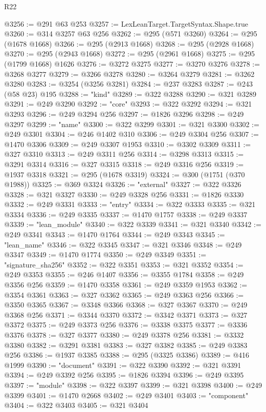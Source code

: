\begin{lexlean}{R22}
\begin{coremodule}
@3256 := @291 @63 @253
@3257 := LexLeanTarget.TargetSyntax.Shape.true
@3260 := @314 @3257 @63 @256
@3262 := @295 (@571 @3260)
@3264 := @295 (@1678 @1668)
@3266 := @295 (@2913 @1668)
@3268 := @295 (@2928 @1668)
@3270 := @295 (@2943 @1668)
@3272 := @295 (@2961 @1668)
@3275 := @295 (@1799 @1668) @1626
@3276 := @3272 @3275
@3277 := @3270 @3276
@3278 := @3268 @3277
@3279 := @3266 @3278
@3280 := @3264 @3279
@3281 := @3262 @3280
@3283 := @3254 (@3256 @3281)
@3284 := @237 @3283
@3287 := @243 (@58 @23) @195
@3288 := "kind"
@3289 := @322 @3288
@3290 := @321 @3289
@3291 := @249 @3290
@3292 := "core"
@3293 := @322 @3292
@3294 := @321 @3293
@3296 := @249 @3294 @256
@3297 := @1826 @3296
@3298 := @249 @3297
@3299 := "name"
@3300 := @322 @3299
@3301 := @321 @3300
@3302 := @249 @3301
@3304 := @246 @1402 @310
@3306 := @249 @3304 @256
@3307 := @1470 @3306
@3309 := @249 @3307 @1953
@3310 := @3302 @3309
@3311 := @327 @3310
@3313 := @249 @3311 @256
@3314 := @3298 @3313
@3315 := @3291 @3314
@3316 := @327 @3315
@3318 := @249 @3316 @256
@3319 := @1937 @3318
@3321 := @295 (@1678 @3319)
@3324 := @300 (@1751 (@370 @1988))
@3325 := @369 @3324
@3326 := "external"
@3327 := @322 @3326
@3328 := @321 @3327
@3330 := @249 @3328 @256
@3331 := @1826 @3330
@3332 := @249 @3331
@3333 := "entry"
@3334 := @322 @3333
@3335 := @321 @3334
@3336 := @249 @3335
@3337 := @1470 @1757
@3338 := @249 @3337
@3339 := "lean_module"
@3340 := @322 @3339
@3341 := @321 @3340
@3342 := @249 @3341
@3343 := @1470 @1764
@3344 := @249 @3343
@3345 := "lean_name"
@3346 := @322 @3345
@3347 := @321 @3346
@3348 := @249 @3347
@3349 := @1470 @1774
@3350 := @249 @3349
@3351 := "signature_sha256"
@3352 := @322 @3351
@3353 := @321 @3352
@3354 := @249 @3353
@3355 := @246 @1407
@3356 := @3355 @1784
@3358 := @249 @3356 @256
@3359 := @1470 @3358
@3361 := @249 @3359 @1953
@3362 := @3354 @3361
@3363 := @327 @3362
@3365 := @249 @3363 @256
@3366 := @3350 @3365
@3367 := @3348 @3366
@3368 := @327 @3367
@3370 := @249 @3368 @256
@3371 := @3344 @3370
@3372 := @3342 @3371
@3373 := @327 @3372
@3375 := @249 @3373 @256
@3376 := @3338 @3375
@3377 := @3336 @3376
@3378 := @327 @3377
@3380 := @249 @3378 @256
@3381 := @3332 @3380
@3382 := @3291 @3381
@3383 := @327 @3382
@3385 := @249 @3383 @256
@3386 := @1937 @3385
@3388 := @295 (@3325 @3386)
@3389 := @416 @1999
@3390 := "document"
@3391 := @322 @3390
@3392 := @321 @3391
@3394 := @249 @3392 @256
@3395 := @1826 @3394
@3396 := @249 @3395
@3397 := "module"
@3398 := @322 @3397
@3399 := @321 @3398
@3400 := @249 @3399
@3401 := @1470 @2668
@3402 := @249 @3401
@3403 := "component"
@3404 := @322 @3403
@3405 := @321 @3404

\end{coremodule}
\end{lexlean}
